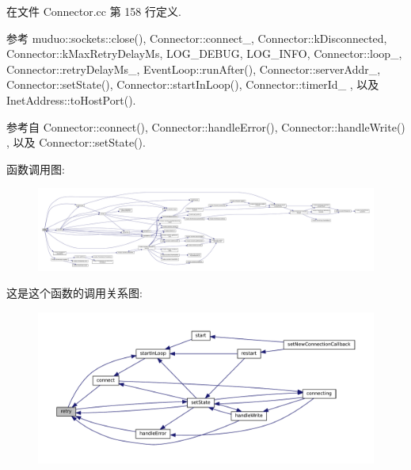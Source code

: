 在文件 Connector.\+cc 第 158 行定义.



参考 muduo\+::sockets\+::close(), Connector\+::connect\+\_\+, Connector\+::k\+Disconnected, Connector\+::k\+Max\+Retry\+Delay\+Ms, L\+O\+G\+\_\+\+D\+E\+B\+UG, L\+O\+G\+\_\+\+I\+N\+FO, Connector\+::loop\+\_\+, Connector\+::retry\+Delay\+Ms\+\_\+, Event\+Loop\+::run\+After(), Connector\+::server\+Addr\+\_\+, Connector\+::set\+State(), Connector\+::start\+In\+Loop(), Connector\+::timer\+Id\+\_\+ , 以及 Inet\+Address\+::to\+Host\+Port().



参考自 Connector\+::connect(), Connector\+::handle\+Error(), Connector\+::handle\+Write() , 以及 Connector\+::set\+State().

函数调用图\+:
\nopagebreak
\begin{figure}[H]
\begin{center}
\leavevmode
\includegraphics[width=350pt]{classmuduo_1_1Connector_a6a23d487c31355d8663ccdd4cbf4f499_cgraph}
\end{center}
\end{figure}
这是这个函数的调用关系图\+:
\nopagebreak
\begin{figure}[H]
\begin{center}
\leavevmode
\includegraphics[width=350pt]{classmuduo_1_1Connector_a6a23d487c31355d8663ccdd4cbf4f499_icgraph}
\end{center}
\end{figure}
\mbox{\label{classmuduo_1_1Connector_a1d3e517d3d87311eb4cb5d51d5a0ce81}} 
